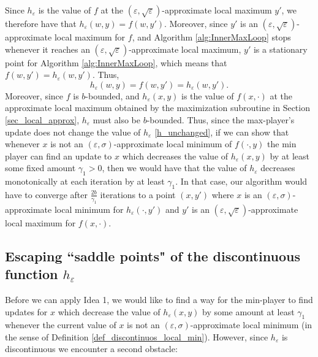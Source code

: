\documentclass[11pt,letterpaper]{article}
\renewcommand{\epsilon}{\varepsilon}
\begin{document}
Since $h_\epsilon$ is the value of $f$ at the $(\epsilon, \sqrt{ \epsilon})$-approximate local maximum $y'$, we therefore have that $h_\epsilon(w, y) = f(w, y')$.
%
Moreover, since $y'$ is an $(\epsilon, \sqrt{ \epsilon})$-approximate local maximum for $f$, and Algorithm \ref{alg:InnerMaxLoop} stops whenever it reaches an $(\epsilon, \sqrt{ \epsilon})$-approximate local maximum, $y'$ is a stationary point for Algorithm \ref{alg:InnerMaxLoop}, which means that $f(w, y') = h_\epsilon(w, y')$.
%
Thus, 
%
\begin{equation} \label{h_unchanged} 
h_\epsilon(w, y) = f(w, y') = h_\epsilon(w, y').
%
\end{equation}
%
Moreover, since $f$ is $b$-bounded, and $h_\epsilon(x,y)$ is the value of $f(x,\cdot)$ at the approximate local maximum obtained by the maximization subroutine in Section \ref{sec_local_approx}, $h_\epsilon$ must also be $b$-bounded.
%
Thus, since the max-player's update does not change the value of $h_\epsilon$  \eqref{h_unchanged}, if we can show that whenever $x$ is not an $(\epsilon, \sigma)$-approximate local minimum of $f(\cdot, y)$ the min player can find an update to $x$ which decreases the value of $h_\epsilon(x,y)$ by at least some fixed amount $\gamma_1>0$, then we would have that the value of $h_\epsilon$ decreases monotonically at each iteration by at least $\gamma_1$. In that case, our algorithm would have to converge after  $\frac{2b}{\gamma_1}$ iterations to a point $(x,y')$ where $x$ is an $(\epsilon, \sigma)$-approximate local minimum for $h_\epsilon(\cdot, y')$ and $y'$ is an $(\epsilon, \sqrt{\epsilon})$-approximate local maximum for $f(x,\cdot)$.





\subsection{Escaping ``saddle points" of the discontinuous function $h_\epsilon$} \label{sec_escape_saddle}
%
 Before we can apply Idea 1, we would like to find a way for the min-player to find updates for $x$ which decrease the value of $h_\epsilon(x,y)$ by some amount at least $\gamma_1$  whenever the current value of $x$ is not an  $(\epsilon, \sigma)$-approximate local minimum (in the sense of Definition \ref{def_discontinuos_local_min}). 
  However, since $h_\epsilon$ is discontinuous we encounter a second obstacle:
\end{document}
